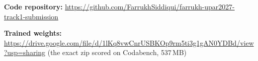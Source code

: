 \documentclass[a4paper, 10pt, conference]{ieeeconf}
\begin{document}
\textbf{Code repository:} \url{https://github.com/FarrukhSiddiqui/farrukh-upar2027-track1-submission}

\textbf{Trained weights:} \url{https://drive.google.com/file/d/1lKq8vwCnrUSBKOp9rm5ti3g1gAN0YDBd/view?usp=sharing} (the exact zip scored on Codabench, 537\,MB)






\end{document}
